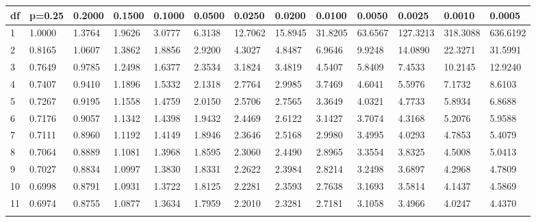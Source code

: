 {
 \fontsize{6pt}{6pt}
 \selectfont
\begin{tabular}{m{6pt}|m{24pt}*{11}{m{24pt}}}\hline 
df  & p=0.25 & 0.2000 & 0.1500 & 0.1000 & 0.0500 & 0.0250 & 0.0200 & 0.0100 & 0.0050 & 0.0025 & 0.0010 & 0.0005 \\\hline 
  1 & 1.0000 & 1.3764 & 1.9626 & 3.0777 & 6.3138 & 12.7062 & 15.8945 & 31.8205 & 63.6567 & 127.3213 & 318.3088 & 636.6192 \\[1pt] \arrayrulecolor{light-gray}\hline\arrayrulecolor{black}  
  2 & 0.8165 & 1.0607 & 1.3862 & 1.8856 & 2.9200 & 4.3027 & 4.8487 & 6.9646 & 9.9248 & 14.0890 & 22.3271 & 31.5991 \\[1pt] \arrayrulecolor{light-gray}\hline\arrayrulecolor{black}  
  3 & 0.7649 & 0.9785 & 1.2498 & 1.6377 & 2.3534 & 3.1824 & 3.4819 & 4.5407 & 5.8409 & 7.4533 & 10.2145 & 12.9240 \\[1pt] \arrayrulecolor{light-gray}\hline\arrayrulecolor{black}  
  4 & 0.7407 & 0.9410 & 1.1896 & 1.5332 & 2.1318 & 2.7764 & 2.9985 & 3.7469 & 4.6041 & 5.5976 & 7.1732 & 8.6103 \\[1pt] \arrayrulecolor{light-gray}\hline\arrayrulecolor{black}  
  5 & 0.7267 & 0.9195 & 1.1558 & 1.4759 & 2.0150 & 2.5706 & 2.7565 & 3.3649 & 4.0321 & 4.7733 & 5.8934 & 6.8688 \\[1pt] \arrayrulecolor{light-gray}\hline\arrayrulecolor{black}  
  6 & 0.7176 & 0.9057 & 1.1342 & 1.4398 & 1.9432 & 2.4469 & 2.6122 & 3.1427 & 3.7074 & 4.3168 & 5.2076 & 5.9588 \\[1pt] \arrayrulecolor{light-gray}\hline\arrayrulecolor{black}  
  7 & 0.7111 & 0.8960 & 1.1192 & 1.4149 & 1.8946 & 2.3646 & 2.5168 & 2.9980 & 3.4995 & 4.0293 & 4.7853 & 5.4079 \\[1pt] \arrayrulecolor{light-gray}\hline\arrayrulecolor{black}  
  8 & 0.7064 & 0.8889 & 1.1081 & 1.3968 & 1.8595 & 2.3060 & 2.4490 & 2.8965 & 3.3554 & 3.8325 & 4.5008 & 5.0413 \\[1pt] \arrayrulecolor{light-gray}\hline\arrayrulecolor{black}  
  9 & 0.7027 & 0.8834 & 1.0997 & 1.3830 & 1.8331 & 2.2622 & 2.3984 & 2.8214 & 3.2498 & 3.6897 & 4.2968 & 4.7809 \\[1pt] \arrayrulecolor{light-gray}\hline\arrayrulecolor{black}  
 10 & 0.6998 & 0.8791 & 1.0931 & 1.3722 & 1.8125 & 2.2281 & 2.3593 & 2.7638 & 3.1693 & 3.5814 & 4.1437 & 4.5869 \\[1pt] \arrayrulecolor{light-gray}\hline\arrayrulecolor{black}  
 11 & 0.6974 & 0.8755 & 1.0877 & 1.3634 & 1.7959 & 2.2010 & 2.3281 & 2.7181 & 3.1058 & 3.4966 & 4.0247 & 4.4370 \\[1pt] \arrayrulecolor{light-gray}\hline\arrayrulecolor{black}  

\end{tabular}}

